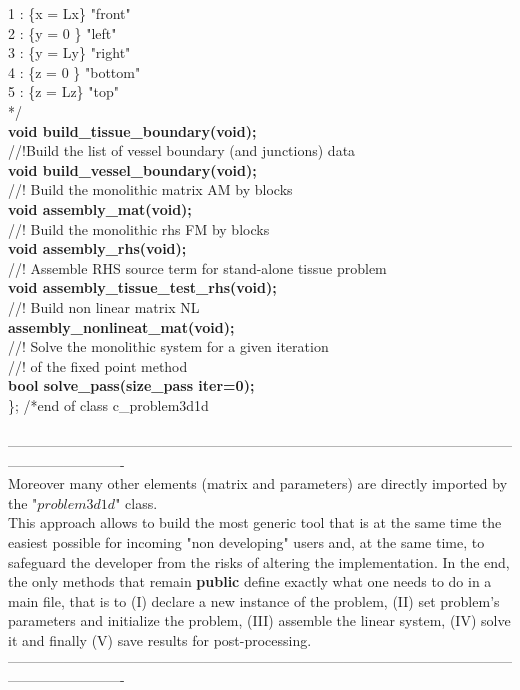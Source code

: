 \documentclass[a4paper]{report}
\newcommand\tab[1][1cm]{\hspace*{#1}}
\begin{document}
{	\tab 1 : \{x = Lx\}  "front"\\
	\tab  2 : \{y = 0 \}  "left"\\
	\tab  3 : \{y = Ly\}  "right"\\
	\tab  4 : \{z = 0 \}  "bottom"\\
	\tab  5 : \{z = Lz\}  "top"\\
	*/\\
\textbf{void build\_\-tissue\_\-boundary(void);}\\
//!Build the list of vessel boundary (and junctions) data\\
\textbf{void build\_\-vessel\_\-boundary(void);}\\
//! Build the monolithic matrix AM by blocks\\
\textbf{void assembly\_\-mat(void);}\\
//! Build the monolithic rhs FM by blocks\\
\textbf{void assembly\_\-rhs(void);}\\
//! Assemble RHS source term for stand-alone tissue problem\\
\textbf{void assembly\_\-tissue\_\-test\_\-rhs(void);}\\
//! Build non linear matrix NL\\
\textbf{assembly\_\-nonlineat\_\-mat(void);}\\
//! Solve the monolithic system for a given iteration\\ //! of the fixed point method\\
\textbf{bool solve\_\-pass(size\_\-pass iter=0);}\\
\}; /*end of class c\_\-problem3d1d
}\\ \\ -------------------------------------------------------------------------------------------------------------------------------------\\
Moreover many other elements (matrix and parameters) are directly imported by the "$problem3d1d$" class.\\
This approach allows to build the most generic tool that is at the same time the easiest possible for incoming "non developing" users and, at the same time, to safeguard the developer from the risks of altering the implementation. In the end, the only methods that remain \textbf{public} define exactly what one needs to do in a main file, that is to (I) declare a new instance of the problem, (II) set problem's parameters and initialize the problem, (III) assemble the linear system, (IV) solve it and finally (V) save results for post-processing.
\\ -------------------------------------------------------------------------------------------------------------------------------------\\ \\
\end{document}
